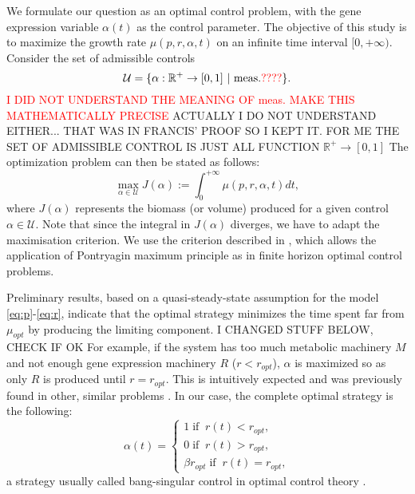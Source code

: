 \documentclass[a4paper, 10pt, conference]{ieeeconf}      %
\newcommand{\tr}[1]{\textcolor{red}{#1}}
\begin{document}
We formulate our question as an optimal control problem, with the gene expression variable $\alpha(t)$ as the control parameter.
The objective of this study is to maximize the growth rate $\mu(p,r, \alpha, t)$ on an infinite time interval $[0, +\infty)$.
Consider the set of admissible controls
\[
\mathcal{U}=\{\alpha:\mathbb{R}^+ \rightarrow [0,1] \ | \ \mathrm{meas.} \tr{???? }\}.
\]
\tr{I DID NOT UNDERSTAND THE MEANING OF meas. MAKE THIS MATHEMATICALLY PRECISE}
{\color{blue} ACTUALLY I DO NOT UNDERSTAND EITHER... THAT WAS IN FRANCIS' PROOF SO I KEPT IT. FOR ME THE SET OF ADMISSIBLE CONTROL IS JUST ALL FUNCTION $\mathbb{R}^+ \rightarrow [0,1]$}
The optimization problem can then be stated as follows:
\begin{equation}\label{Prob}
\max_{\alpha \in \mathcal{U}} J(\alpha):=\int_0^{+\infty} \mu(p, r, \alpha, t) dt,
\end{equation}
where $J(\alpha)$ represents the biomass (or volume) produced for a given control $\alpha\in \mathcal{U}$.
Note that since the integral in $J(\alpha)$ diverges, we have to adapt the maximisation criterion.
We use the criterion described in \cite{halkin_necessary_1974}, which allows the application of Pontryagin maximum principle as in finite horizon optimal control problems.

Preliminary results, based on a quasi-steady-state assumption for the model \eqref{eq:p}-\eqref{eq:r}, indicate that the optimal strategy minimizes the time spent far from $\mu_{opt}$ by producing the limiting component.
{\color{blue} I CHANGED STUFF BELOW, CHECK IF OK}
For example, if the system has too much metabolic machinery $M$ and not enough gene expression machinery $R$ ($r < r_{opt}$), $\alpha$ is maximized so as only $R$ is produced until $r = r_{opt}$.
This is intuitively expected and was previously found in other, similar problems \cite{berg_optimal_1998, berg_optimal_2002, pavlov_optimal_2013}. In our case, the complete optimal strategy is the following:
\begin{equation}
\alpha(t) = 
\begin{cases}
1 \; \text{if} \;\; r(t)<r_{opt},\\
0 \; \text{if} \;\; r(t)>r_{opt},\\
\beta r_{opt} \; \text{if} \;\; r(t)=r_{opt},
\end{cases}
\label{optstrat}
\end{equation}
a strategy usually called bang-singular control in optimal control theory \cite{bryson_applied_1975}. 
\end{document}
